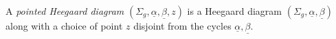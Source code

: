 

    A \emph{pointed Heegaard diagram}  $(\Sigma_g, \underline \alpha, \underline \beta, z)$ is a Heegaard diagram $(\Sigma_g, \underline \alpha, \underline \beta)$ along with a choice of point $z$ disjoint from the cycles $\underline \alpha, \underline \beta$.
